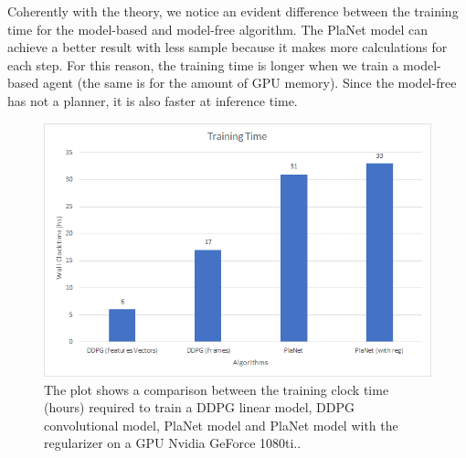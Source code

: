 Coherently with the theory, we notice an evident difference between the training time for the model-based and model-free algorithm.
The PlaNet model can achieve a better result with less sample because it makes more calculations for each step. For this reason, the training time is longer when we train a model-based agent (the same is for the amount of GPU memory). Since the model-free has not a planner, it is also faster at inference time. 

\begin{figure}[H]
\centering
\includegraphics[width=1 \textwidth, height=.35 \textheight]{pictures/tempi_di_training}
\caption{ The plot shows a comparison between the training clock time (hours) required to train a DDPG linear model, DDPG convolutional model, PlaNet model and PlaNet model with the regularizer on a GPU Nvidia GeForce 1080ti..  }
\end{figure}